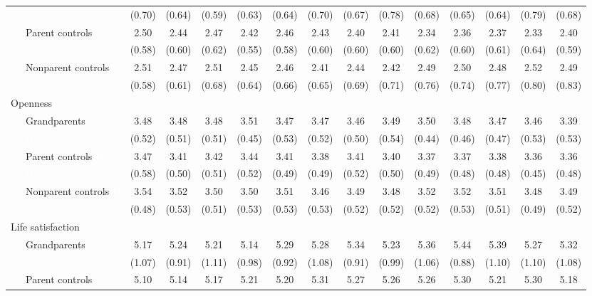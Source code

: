 \documentclass[
  english,
  man,floatsintext]{apa7}
\newenvironment{lltable}{\begin{landscape}\begin{center}\begin{ThreePartTable}}{\end{ThreePartTable}\end{center}\end{landscape}}
\begin{document}
\begin{lltable}
{\begin{longtable}{lccccccccccccc}
\ \ \ \textcolor{white}{Ng} & (0.70) & (0.64) & (0.59) & (0.63) & (0.64) & (0.70) & (0.67) & (0.78) & (0.68) & (0.65) & (0.64) & (0.79) & (0.68)\\
\ \ \ Parent controls \textcolor{white}{N} & 2.50 & 2.44 & 2.47 & 2.42 & 2.46 & 2.43 & 2.40 & 2.41 & 2.34 & 2.36 & 2.37 & 2.33 & 2.40\\
\ \ \ \textcolor{white}{Np} & (0.58) & (0.60) & (0.62) & (0.55) & (0.58) & (0.60) & (0.60) & (0.60) & (0.62) & (0.60) & (0.61) & (0.64) & (0.59)\\
\ \ \ Nonparent controls \textcolor{white}{N} & 2.51 & 2.47 & 2.51 & 2.45 & 2.46 & 2.41 & 2.44 & 2.42 & 2.49 & 2.50 & 2.48 & 2.52 & 2.49\\
\ \ \ \textcolor{white}{Nn} & (0.58) & (0.61) & (0.68) & (0.64) & (0.66) & (0.65) & (0.69) & (0.71) & (0.76) & (0.74) & (0.77) & (0.80) & (0.83)\\
Openness &  &  &  &  &  &  &  &  &  &  &  &  & \\
\ \ \ Grandparents \textcolor{white}{O} & 3.48 & 3.48 & 3.48 & 3.51 & 3.47 & 3.47 & 3.46 & 3.49 & 3.50 & 3.48 & 3.47 & 3.46 & 3.39\\
\ \ \ \textcolor{white}{Og} & (0.52) & (0.51) & (0.51) & (0.45) & (0.53) & (0.52) & (0.50) & (0.54) & (0.44) & (0.46) & (0.47) & (0.53) & (0.53)\\
\ \ \ Parent controls \textcolor{white}{O} & 3.47 & 3.41 & 3.42 & 3.44 & 3.41 & 3.38 & 3.41 & 3.40 & 3.37 & 3.37 & 3.38 & 3.36 & 3.36\\
\ \ \ \textcolor{white}{Op} & (0.58) & (0.50) & (0.51) & (0.52) & (0.49) & (0.49) & (0.52) & (0.50) & (0.49) & (0.48) & (0.48) & (0.45) & (0.48)\\
\ \ \ Nonparent controls \textcolor{white}{O} & 3.54 & 3.52 & 3.50 & 3.50 & 3.51 & 3.46 & 3.49 & 3.48 & 3.52 & 3.52 & 3.51 & 3.48 & 3.49\\
\ \ \ \textcolor{white}{On} & (0.48) & (0.53) & (0.51) & (0.53) & (0.53) & (0.53) & (0.52) & (0.52) & (0.52) & (0.53) & (0.51) & (0.49) & (0.52)\\
Life satisfaction &  &  &  &  &  &  &  &  &  &  &  &  & \\
\ \ \ Grandparents \textcolor{white}{L} & 5.17 & 5.24 & 5.21 & 5.14 & 5.29 & 5.28 & 5.34 & 5.23 & 5.36 & 5.44 & 5.39 & 5.27 & 5.32\\
\ \ \ \textcolor{white}{Lg} & (1.07) & (0.91) & (1.11) & (0.98) & (0.92) & (1.08) & (0.91) & (0.99) & (1.06) & (0.88) & (1.10) & (1.10) & (1.08)\\
\ \ \ Parent controls \textcolor{white}{L} & 5.10 & 5.14 & 5.17 & 5.21 & 5.20 & 5.31 & 5.27 & 5.26 & 5.26 & 5.30 & 5.21 & 5.30 & 5.18\\

\end{longtable}}
\end{lltable}
\end{document}
